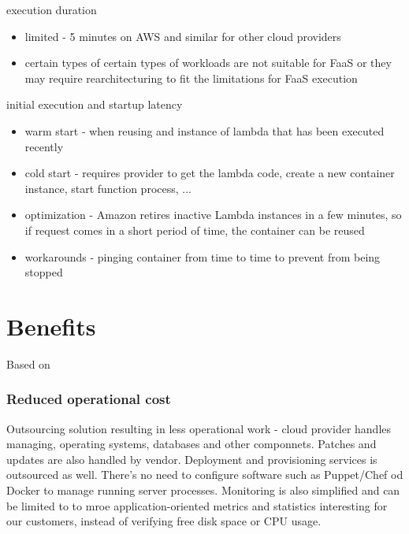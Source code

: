 \noindent execution duration

\begin{itemize}
    \item limited - 5 minutes on AWS and similar for other cloud providers
    \item certain types of certain types of workloads are not suitable for FaaS or they may require rearchitecturing to fit the limitations for FaaS execution
\end{itemize}

\noindent initial execution and startup latency

\begin{itemize}
    \item warm start - when reusing and instance of lambda that has been executed recently
    \item cold start - requires provider to get the lambda code, create a new container instance, start function process, ...
    \item optimization - Amazon retires inactive Lambda instances in a few minutes, so if request comes in a short period of time, the container can be reused
    \item workarounds - pinging container from time to time to prevent from being stopped

\end{itemize}

\section*{Benefits}

Based on \cite{MartinFowler} \cite{RobertsChapin2017}

\subsubsection*{Reduced operational cost}
 
Outsourcing solution resulting in less operational work - cloud provider handles managing, operating systems, databases and other componnets. Patches and updates are also handled by vendor. Deployment and provisioning services is outsourced as well. There's no need to configure software such as Puppet/Chef od Docker to manage running server processes. Monitoring is also simplified and can be limited to  to mroe application-oriented metrics and statistics interesting for our customers, instead of verifying free disk space or CPU usage.


